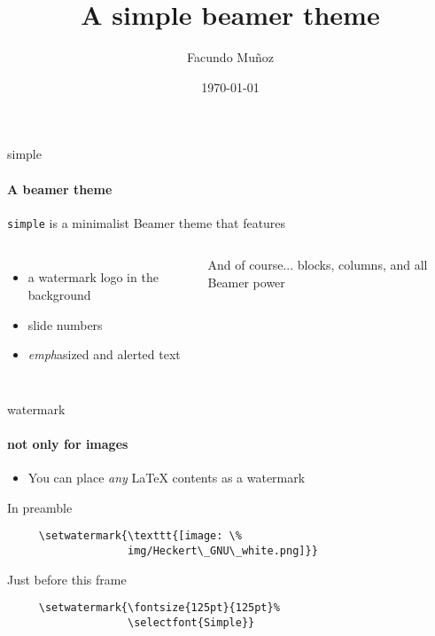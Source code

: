 \documentclass{beamer}
\title{A simple beamer theme}
\subtitle{}
\date{\today}
\author{Facundo Mu\~noz}
\institute{\url{http://github.com/famuvie}}
\begin{document}
\maketitle

\begin{frame}{simple}
  \framesubtitle{A beamer theme}

  \texttt{simple} is a minimalist Beamer theme that features

  \begin{columns}
      \begin{itemize}
        \item a \alert{watermark} logo in the background
        \item slide \alert{numbers}
        \item \emph{emph}asized and \alert{alert}ed text
      \end{itemize}

      \begin{block}{And of course...}
         blocks, columns, and all Beamer power
      \end{block}
  \end{columns}

\end{frame}



\setwatermark{\fontsize{125pt}{125pt}\selectfont{Simple}}

\begin{frame}[fragile]{watermark}
  \framesubtitle{not only for images}

  \begin{itemize}
    \item You can place \emph{any} \LaTeX{} \alert{contents} as a watermark
  \end{itemize}

  \begin{block}{In preamble}
    \begin{verbatim}
     \setwatermark{\texttt{[image: \%
                   img/Heckert\_GNU\_white.png]}}
    \end{verbatim}
  \end{block}

  \begin{block}{Just before this frame}
    \begin{verbatim}
     \setwatermark{\fontsize{125pt}{125pt}%
                   \selectfont{Simple}}
    \end{verbatim}
  \end{block}


\end{frame}
\end{document}
